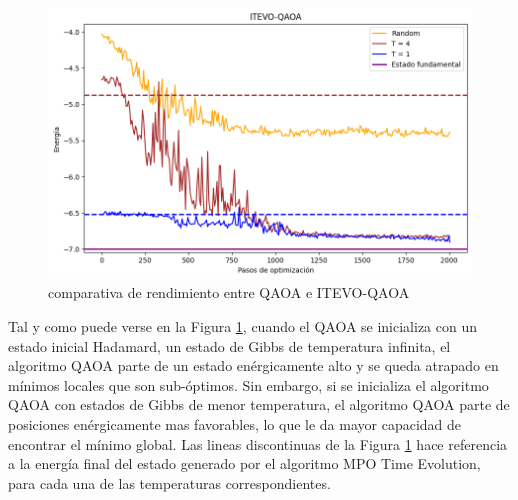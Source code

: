 \begin{figure}[!h]
    \centering
    \includegraphics[scale = 0.7]{plt/06-itevo_qaoa.png}
    \caption{comparativa de rendimiento entre QAOA e ITEVO-QAOA}
    \label{fig:itevo_qaoa}
\end{figure}

Tal y como puede verse en la Figura \ref{fig:itevo_qaoa}, cuando el QAOA se inicializa con un estado inicial Hadamard, un estado de Gibbs de temperatura infinita, el algoritmo QAOA parte de un estado enérgicamente alto y se queda atrapado en mínimos locales que son sub-óptimos. Sin embargo, si se inicializa el algoritmo QAOA con estados de Gibbs de menor temperatura, el algoritmo QAOA parte de posiciones enérgicamente mas favorables, lo que le da mayor capacidad de encontrar el mínimo global. Las lineas discontinuas de la Figura \ref{fig:itevo_qaoa} hace referencia a la energía final del estado generado por el algoritmo MPO Time Evolution, para cada una de las temperaturas correspondientes.